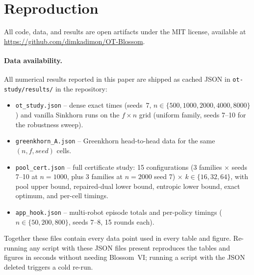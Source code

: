 \documentclass[11pt]{article}
\theoremstyle{remark}
\begin{document}
\section{Reproduction}
\label{app:repro}

All code, data, and results are open artifacts under the MIT license,
available at
\url{https://github.com/dimkadimon/OT-Blossom}.

\paragraph{Data availability.}
All numerical results reported in this paper are shipped as cached JSON
in \texttt{ot-study/results/} in the repository:
\begin{itemize}[leftmargin=2em,itemsep=1pt]
\item \texttt{ot\_study.json} -- dense exact times (seeds~7, $n\in\{500,1000,2000,4000,8000\}$) and vanilla Sinkhorn runs on the $f\times n$ grid
  (uniform family, seeds 7--10 for the robustness sweep).
\item \texttt{greenkhorn\_A.json} -- Greenkhorn head-to-head data for the
  same $(n,f,seed)$ cells.
\item \texttt{pool\_cert.json} -- full certificate study: 15
  configurations (3 families $\times$ seeds 7--10 at $n=1000$, plus 3
  families at $n=2000$ seed 7) $\times$ $k\in\{16,32,64\}$, with pool
  upper bound, repaired-dual lower bound, entropic lower bound, exact
  optimum, and per-cell timings.
\item \texttt{app\_hook.json} -- multi-robot episode totals and
  per-policy timings ($n\in\{50,200,800\}$, seeds 7--8, 15 rounds each).
\end{itemize}
Together these files contain every data point used in every table and
figure. Re-running any script with these JSON files present reproduces
the tables and figures in seconds without needing Blossom~VI; running a
script with the JSON deleted triggers a cold re-run.
\end{document}
